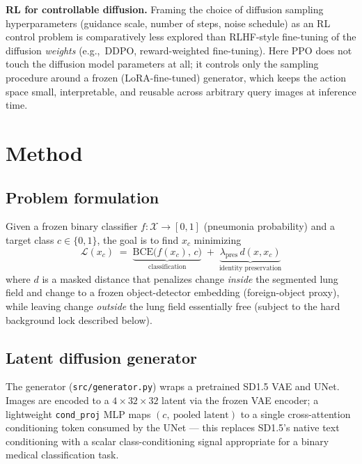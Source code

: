 \documentclass[11pt]{article}
\newcommand{\eg}{e.g.,\ }
\begin{document}
\textbf{RL for controllable diffusion.} Framing the choice of diffusion
sampling hyperparameters (guidance scale, number of steps, noise schedule)
as an RL control problem is comparatively less explored than RLHF-style
fine-tuning of the diffusion \emph{weights} (\eg DDPO,
reward-weighted fine-tuning). Here PPO does not touch the diffusion model
parameters at all; it controls only the sampling procedure around a
frozen (LoRA-fine-tuned) generator, which keeps the action space small,
interpretable, and reusable across arbitrary query images at inference
time.

\section{Method}

\subsection{Problem formulation}

Given a frozen binary classifier $f: \mathcal{X} \to [0,1]$ (pneumonia
probability) and a target class $c \in \{0, 1\}$, the goal is to find
$x_c$ minimizing
\[
  \mathcal{L}(x_c) \;=\; \underbrace{\mathrm{BCE}\big(f(x_c),\, c\big)}_{\text{classification}}
  \;+\; \underbrace{\lambda_{\text{pres}}\, d(x, x_c)}_{\text{identity preservation}}
\]
where $d$ is a masked distance that penalizes change \emph{inside} the
segmented lung field and change to a frozen object-detector embedding
(foreign-object proxy), while leaving change \emph{outside} the lung field
essentially free (subject to the hard background lock described below).

\subsection{Latent diffusion generator}

The generator (\texttt{src/generator.py}) wraps a pretrained SD1.5 VAE and
UNet. Images are encoded to a $4\times32\times32$ latent via the frozen
VAE encoder; a lightweight \texttt{cond\_proj} MLP maps $(c,\ \text{pooled
latent})$ to a single cross-attention conditioning token consumed by the
UNet — this replaces SD1.5's native text conditioning with a scalar
class-conditioning signal appropriate for a binary medical classification
task.
\end{document}
